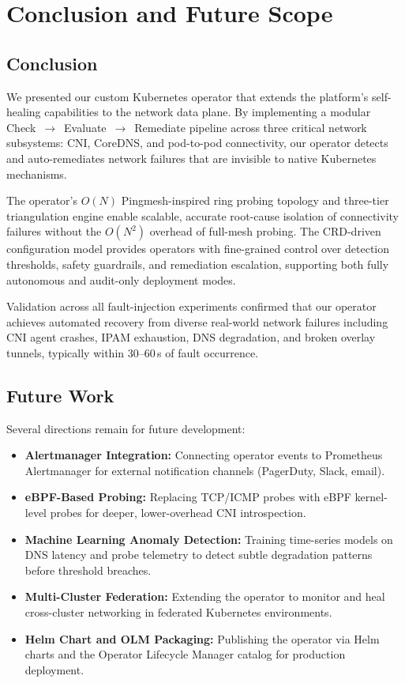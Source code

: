 \documentclass[conference]{IEEEtran}
\begin{document}
\section{Conclusion and Future Scope}

\subsection{Conclusion}
We presented our custom Kubernetes operator that extends the platform's self-healing capabilities to the network data plane. By implementing a modular Check~$\to$~Evaluate~$\to$~Remediate pipeline across three critical network subsystems: CNI, CoreDNS, and pod-to-pod connectivity, our operator detects and auto-remediates network failures that are invisible to native Kubernetes mechanisms.

The operator's $O(N)$ Pingmesh-inspired ring probing topology and three-tier triangulation engine enable scalable, accurate root-cause isolation of connectivity failures without the $O(N^2)$ overhead of full-mesh probing. The CRD-driven configuration model provides operators with fine-grained control over detection thresholds, safety guardrails, and remediation escalation, supporting both fully autonomous and audit-only deployment modes.

Validation across all fault-injection experiments confirmed that our operator achieves automated recovery from diverse real-world network failures including CNI agent crashes, IPAM exhaustion, DNS degradation, and broken overlay tunnels, typically within 30--60\,s of fault occurrence.

\subsection{Future Work}
Several directions remain for future development:
\begin{itemize}
  \item \textbf{Alertmanager Integration:} Connecting operator events to Prometheus Alertmanager for external notification channels (PagerDuty, Slack, email).
  \item \textbf{eBPF-Based Probing:} Replacing TCP/ICMP probes with eBPF kernel-level probes for deeper, lower-overhead CNI introspection.
  \item \textbf{Machine Learning Anomaly Detection:} Training time-series models on DNS latency and probe telemetry to detect subtle degradation patterns before threshold breaches.
  \item \textbf{Multi-Cluster Federation:} Extending the operator to monitor and heal cross-cluster networking in federated Kubernetes environments.
  \item \textbf{Helm Chart and OLM Packaging:} Publishing the operator via Helm charts and the Operator Lifecycle Manager catalog for production deployment.
\end{itemize}

\balance


\end{document}
